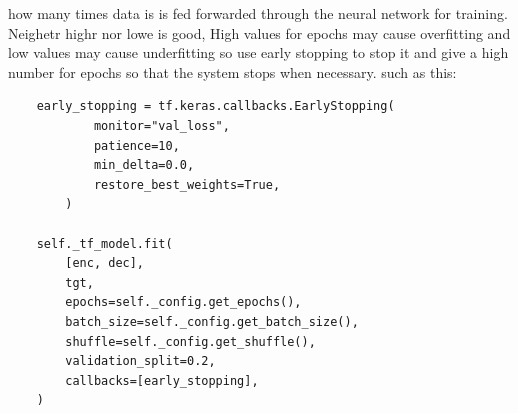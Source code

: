 how many times data is is fed forwarded through the neural network for training. Neighetr highr nor lowe is good, High values for epochs may cause overfitting and low values may cause underfitting so use early stopping to stop it and give a high number for epochs so that the system stops when necessary. such as this:
\begin{verbatim}
    early_stopping = tf.keras.callbacks.EarlyStopping(
            monitor="val_loss",
            patience=10,
            min_delta=0.0,
            restore_best_weights=True,
        )

    self._tf_model.fit(
        [enc, dec],
        tgt,
        epochs=self._config.get_epochs(),
        batch_size=self._config.get_batch_size(),
        shuffle=self._config.get_shuffle(),
        validation_split=0.2,
        callbacks=[early_stopping],
    )
\end{verbatim}